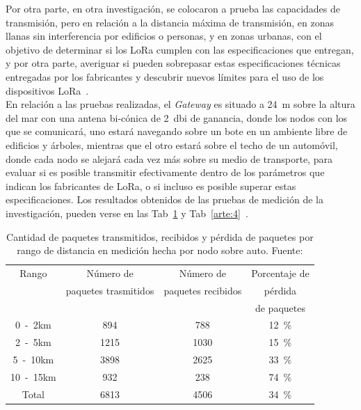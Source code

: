 \begin{justify}
Por otra parte, en otra investigación, se colocaron a prueba las capacidades de transmisión, pero en relación a la distancia máxima de transmisión, en zonas llanas sin interferencia por edificios o personas, y en zonas urbanas, con el objetivo de determinar si los LoRa cumplen con las especificaciones que entregan, y por otra parte, averiguar si pueden sobrepasar estas especificaciones técnicas entregadas por los fabricantes y descubrir nuevos límites para el uso de los dispositivos LoRa~\cite{Juha}.\\
En relación a las pruebas realizadas, el \textit{Gateway} es situado a \SI{24}{\meter} sobre la altura del mar con una antena bi-cónica de \SI{2}{dbi} de ganancia, donde los nodos con los que se comunicará, uno estará navegando sobre un bote en un ambiente libre de edificios y árboles, mientras que el otro estará sobre el techo de un automóvil, donde cada nodo se alejará cada vez más sobre su medio de transporte, para evaluar si es posible transmitir efectivamente dentro de los parámetros que indican los fabricantes de LoRa, o si incluso es posible superar estas especificaciones. Los resultados obtenidos de las pruebas de medición de la investigación, pueden verse en las Tab~\ref{arte:3} y Tab~\ref{arte:4}~\cite{Juha}.\\
\begin{table}[!ht]
\centering
\begin{tabular}{|c|c|c|c|}
\hline
Rango & Número de            & Número de          & Porcentaje de  \\
      & paquetes trasmitidos & paquetes recibidos &  pérdida\\ 
      &                      &                    &   de paquetes \\ \hline
\si{0-2}{km} & \num{894} & \num{788} & \SI{12}{\percent} \\ \hline
\si{2-5}{km} & \num{1215} & \num{1030} & \SI{15}{\percent} \\ \hline
\si{5-10}{km} & \num{3898} & \num{2625} & \SI{33}{\percent} \\ \hline
\si{10-15}{km} & \num{932} & \num{238} & \SI{74}{\percent} \\ \hline
Total & \num{6813} & \num{4506} & \SI{34}{\percent} \\ \hline
\end{tabular}
\caption{Cantidad de paquetes transmitidos, recibidos y pérdida de paquetes por rango de distancia en medición hecha por nodo sobre auto. Fuente:\cite{Juha}}
\label{arte:3}
\end{table}


\end{justify}
